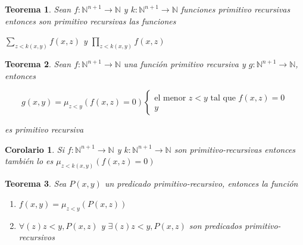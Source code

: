 \documentclass[a4paper,1pt]{report}
\newtheorem*{teo}{Teorema}
\newtheorem*{cor}{Corolario}
\begin{document}
\begin{teo}
 Sean $f:\mathbb{N}^{n+1}\rightarrow\mathbb{N}$ y $k:\mathbb{N}^{n+1}\rightarrow\mathbb{N}$ funciones primitivo recursivas entonces son primitivo recursivas las funciones 
 
 $\sum_{z<k(x,y)}f(x,z)$ y $\prod_{z<k(x,y)}f(x,z)$
\end{teo}

\begin{teo}
 Sean $f:\mathbb{N}^{n+1}\rightarrow\mathbb{N}$ una función primitivo recursiva y $g:\mathbb{N}^{n+1}\rightarrow\mathbb{N}$, entonces
 
 \begin{equation}
g(x,y) = \mu_{z<y}(f(x,z)=0) 
\begin{cases}
\text{el menor } z<y \text{ tal que }f(x,z)=0\\
y
\end{cases}
\end{equation}

es primitivo recursiva
 
\end{teo}


\begin{cor}
 Si  $f:\mathbb{N}^{n+1}\rightarrow\mathbb{N}$ y $k:\mathbb{N}^{n+1}\rightarrow\mathbb{N}$ son primitivo-recursivas entonces también lo es $\mu_{z<k(x,y)}(f(x,z)=0) $
\end{cor}

\begin{teo}
Sea $P(x,y)$ un predicado primitivo-recursivo, entonces la función 
\begin{enumerate}
 \item $f(x,y)=\mu_{z<y}(P(x,z))$
 \item $\forall(z) z<y, P(x,z)$ y $\exists(z)z<y, P(x,z)$ son predicados primitivo-recursivos
\end{enumerate}


\end{teo}

  
\end{document}
